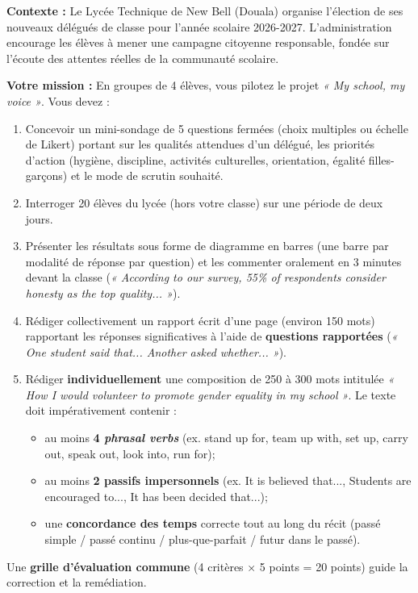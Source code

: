 \documentclass[11pt]{article}
\newcommand{\cle}[1]{{\popxbold\color{popdark}#1}}
\newcounter{popsec}
\newcounter{popsub}
\newcommand{\courssub}[1]{%
  \stepcounter{popsub}%
  \par\vspace{9pt}\noindent{\popxbold\fontsize{11.5}{13}\selectfont\color{popink}{\color{poporange}\thepopsec.\thepopsub}\hspace{6pt}#1}\par\nopagebreak\vspace{4pt}
}
\begin{document}
\courssub{Situation}
\textbf{Contexte :} Le Lycée Technique de New Bell (Douala) organise l'élection de ses nouveaux délégués de classe pour l'année scolaire 2026-2027. L'administration encourage les élèves à mener une campagne citoyenne responsable, fondée sur l'écoute des attentes réelles de la communauté scolaire.

\textbf{Votre mission :} En groupes de 4 élèves, vous pilotez le projet \emph{« My school, my voice »}. Vous devez :
\begin{enumerate}
    \item Concevoir un mini-sondage de 5 questions fermées (choix multiples ou échelle de Likert) portant sur les qualités attendues d'un délégué, les priorités d'action (hygiène, discipline, activités culturelles, orientation, égalité filles-garçons) et le mode de scrutin souhaité.
    \item Interroger 20 élèves du lycée (hors votre classe) sur une période de deux jours.
    \item Présenter les résultats sous forme de diagramme en barres (une barre par modalité de réponse par question) et les commenter oralement en 3 minutes devant la classe (\emph{« According to our survey, 55\% of respondents consider honesty as the top quality... »}).
    \item Rédiger collectivement un rapport écrit d'une page (environ 150 mots) rapportant les réponses significatives à l'aide de \textbf{questions rapportées} (\emph{« One student said that... Another asked whether... »}).
    \item Rédiger \textbf{individuellement} une composition de 250 à 300 mots intitulée \emph{« How I would volunteer to promote gender equality in my school »}. Le texte doit impérativement contenir :
    \begin{itemize}
        \item au moins \textbf{4 \emph{phrasal verbs}} (ex. \cle{stand up for}, \cle{team up with}, \cle{set up}, \cle{carry out}, \cle{speak out}, \cle{look into}, \cle{run for});
        \item au moins \textbf{2 passifs impersonnels} (ex. \cle{It is believed that...}, \cle{Students are encouraged to...}, \cle{It has been decided that...});
        \item une \textbf{concordance des temps} correcte tout au long du récit (passé simple / passé continu / plus-que-parfait / futur dans le passé).
    \end{itemize}
\end{enumerate}
Une \textbf{grille d'évaluation commune} (4 critères × 5 points = 20 points) guide la correction et la remédiation.
\end{document}
